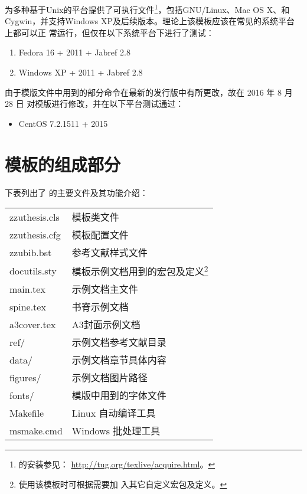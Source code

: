 \TeXLive{}为多种基于Unix的平台提供了可执行文件\footnote{\TeXLive{}的安装参见：
\url{http://tug.org/texlive/acquire.html}。}，包括GNU/Linux、Mac OS X、和
Cygwin，并支持Windows XP及后续版本。理论上该模板应该在常见的系统平台上都可以正
常运行，但仅在以下系统平台下进行了测试：
\begin{enumerate}
\item Fedora 16 + \TeXLive{} 2011 + Jabref 2.8
\item Windows XP + \TeXLive{} 2011 + Jabref 2.8
\end{enumerate}

由于模版文件中用到的部分命令在最新的发行版中有所更改，故在 2016 年 8 月 28 日
对模版进行修改，并在以下平台测试通过：

\begin{itemize}
\item CentOS 7.2.1511 + \TeXLive{} 2015
\end{itemize}

\section{模板的组成部分}

下表列出了 \zzuthesis{} 的主要文件及其功能介绍：
\begin{center}
\tabletail{\hline}
  \begin{mpsupertabular}{l|p{8cm}}
zzuthesis.cls & 模板类文件\\
zzuthesis.cfg & 模板配置文件\\
zzubib.bst & 参考文献样式文件\\\hline
docutils.sty & 模板示例文档用到的宏包及定义\footnote{使用该模板时可根据需要加
入其它自定义宏包及定义。}\\ 
main.tex & 示例文档主文件\\
spine.tex & 书脊示例文档\\
a3cover.tex & A3封面示例文档\\
ref/ & 示例文档参考文献目录\\
data/ & 示例文档章节具体内容\\
figures/ & 示例文档图片路径\\
fonts/ & 模版中用到的字体文件\\\hline
Makefile & Linux 自动编译工具\\
msmake.cmd & Windows 批处理工具\\
  \end{mpsupertabular}
\end{center}

